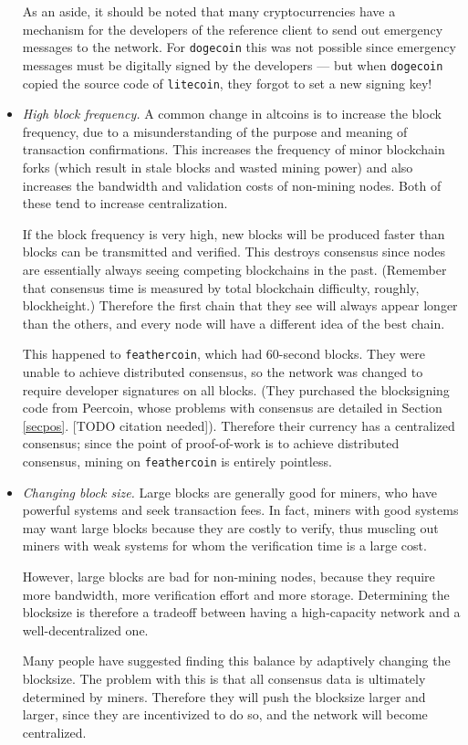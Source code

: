 \documentclass[letterpaper]{article}
\begin{document}
\begin{itemize}
As an aside, it should be noted that many cryptocurrencies have a mechanism for
the developers of the reference client to send out emergency messages to the
network. For \texttt{dogecoin} this was not possible since emergency messages
must be digitally signed by the developers --- but when \texttt{dogecoin} copied
the source code of \texttt{litecoin}, they forgot to set a new signing key!

\item \emph{High block frequency.} A common change in altcoins is to increase
the block frequency, due to a misunderstanding of the purpose and meaning of
transaction confirmations. This increases the frequency of minor blockchain
forks (which result in stale blocks and wasted mining power) and also increases
the bandwidth and validation costs of non-mining nodes. Both of these tend to
increase centralization.

If the block frequency is very high, new blocks will be produced faster than
blocks can be transmitted and verified. This destroys consensus since nodes
are essentially always seeing competing blockchains in the past. (Remember
that consensus time is measured by total blockchain difficulty, roughly,
blockheight.) Therefore the first chain that they see will always appear
longer than the others, and every node will have a different idea of the
best chain.

This happened to \texttt{feathercoin}, which had 60-second blocks. They were
unable to achieve distributed consensus, so the network was changed to require
developer signatures on all blocks. (They purchased the blocksigning code from
Peercoin, whose problems with consensus are detailed in Section \ref{secpos}.
[TODO citation needed]). Therefore their currency has a centralized consensus;
since the point of proof-of-work is to achieve distributed consensus, mining
on \texttt{feathercoin} is entirely pointless.

\item \emph{Changing block size.} Large blocks are generally good for miners,
who have powerful systems and seek transaction fees. In fact, miners with good
systems may want large blocks because they are costly to verify, thus muscling
out miners with weak systems for whom the verification time is a large cost.

However, large blocks are bad for non-mining nodes, because they require more
bandwidth, more verification effort and more storage. Determining the blocksize
is therefore a tradeoff between having a high-capacity network and a well-decentralized
one.

Many people have suggested finding this balance by adaptively changing the blocksize.
The problem with this is that all consensus data is ultimately determined by miners.
Therefore they will push the blocksize larger and larger, since they are incentivized
to do so, and the network will become centralized.
\end{itemize}
\end{document}
